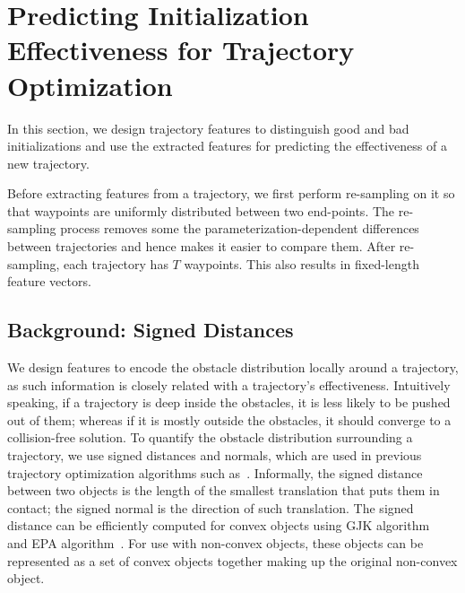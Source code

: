 \documentclass[letterpaper, 10 pt, conference]{ieeeconf}  %
\begin{document}
\section{Predicting Initialization Effectiveness for Trajectory Optimization}
\label{sec:predict}
In this section, we design trajectory features to distinguish good and bad initializations and use the extracted features for predicting the effectiveness of a new trajectory.

Before extracting features from a trajectory, we first perform re-sampling on it so that waypoints are uniformly distributed between two end-points.
The re-sampling process removes some the parameterization-dependent differences between trajectories and hence makes it easier to compare them. After re-sampling, each trajectory has $T$ waypoints. This also results in fixed-length feature vectors.


\subsection{Background: Signed Distances}
We design features to encode the obstacle distribution locally around a trajectory, as such information is closely related with a trajectory's effectiveness. Intuitively speaking, if a trajectory is deep inside the obstacles, it is less likely to be pushed out of them; whereas if it is mostly outside the obstacles, it should converge to a collision-free solution. To quantify the obstacle distribution surrounding a trajectory, we use signed distances and normals, which are used in previous trajectory optimization algorithms such as~\cite{Schulman:2013:FLO}. Informally, the signed distance between two objects is the length of the smallest translation that puts them in contact; the signed normal is the direction of such translation. The signed distance can be efficiently computed for convex objects using GJK algorithm~\cite{Gilbert:1988:GJK} and EPA algorithm~\cite{Bergen:2001:EPA}.   For use with non-convex objects, these objects can be represented as a set of convex objects together making up the original non-convex object.
\end{document}
